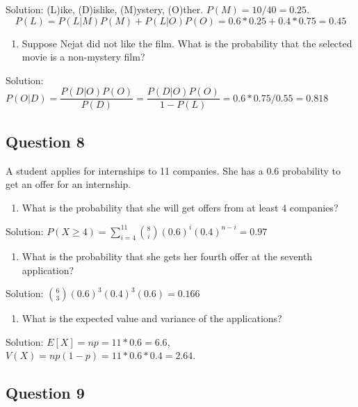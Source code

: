 \documentclass[]{book}
\providecommand{\tightlist}{%
  \setlength{\itemsep}{0pt}\setlength{\parskip}{0pt}}
\theoremstyle{definition}
\theoremstyle{definition}
\theoremstyle{definition}
\theoremstyle{remark}
\begin{document}
Solution: (L)ike, (D)islike, (M)ystery, (O)ther.
\(P(M) = 10/40 = 0.25\).
\[P(L) = P(L|M)P(M) + P(L|O)P(O) = 0.6*0.25 + 0.4*0.75 = 0.45\]

\begin{enumerate}
\def\labelenumi{\alph{enumi})}
\setcounter{enumi}{1}
\tightlist
\item
  Suppose Nejat did not like the film. What is the probability that the
  selected movie is a non-mystery film?
\end{enumerate}

Solution:
\(P(O|D) = \dfrac{P(D|O)P(O)}{P(D)} = \dfrac{P(D|O)P(O)}{1-P(L)} = 0.6*0.75/0.55 = 0.818\)

\hypertarget{question-8}{%
\subsection{Question 8}\label{question-8}}

A student applies for internships to 11 companies. She has a 0.6
probability to get an offer for an internship.

\begin{enumerate}
\def\labelenumi{\alph{enumi})}
\tightlist
\item
  What is the probability that she will get offers from at least 4
  companies?
\end{enumerate}

Solution:
\(P(X \ge 4) = \sum_{i=4}^{11} \binom{8}{i} (0.6)^i(0.4)^{n-i} = 0.97\)

\begin{enumerate}
\def\labelenumi{\alph{enumi})}
\setcounter{enumi}{1}
\tightlist
\item
  What is the probability that she gets her fourth offer at the seventh
  application?
\end{enumerate}

Solution: \(\binom{6}{3} (0.6)^3(0.4)^{3}(0.6) = 0.166\)

\begin{enumerate}
\def\labelenumi{\alph{enumi})}
\setcounter{enumi}{2}
\tightlist
\item
  What is the expected value and variance of the applications?
\end{enumerate}

Solution: \(E[X] = np = 11*0.6 = 6.6\),
\(V(X) = np(1-p) = 11*0.6*0.4 = 2.64\).

\hypertarget{question-9}{%
\subsection{Question 9}\label{question-9}}
\end{document}
